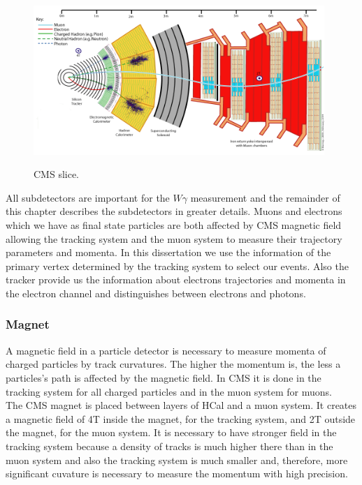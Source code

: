 \begin{figure}[htb]
  \begin{center}
    {\includegraphics[width=0.98\textwidth]{../figs/Exp/CMS_Slice.png}}
    \caption{CMS slice.}
    \label{fig:CMS_slice}
  \end{center}
\end{figure}


All subdetectors are important for the $W\gamma$ measurement and the remainder of this chapter describes the subdetectors in greater details. Muons and electrons which we have as final state particles are both affected by CMS magnetic field allowing the tracking system and the muon system to measure their trajectory parameters and momenta. In this dissertation we use the information of the primary vertex determined by the tracking system to select our events. Also the tracker provide us the information about electrons trajectories and momenta in the electron channel and distinguishes between electrons and photons.\\

\subsubsection{Magnet}

A magnetic field in a particle detector is necessary to measure momenta of charged particles by track curvatures. The higher the momentum is, the less a particles's path is affected by the magnetic field. In CMS it is done in the tracking system for all charged particles and in the muon system for muons.\\

The CMS magnet is placed between layers of HCal and a muon system. It creates a magnetic field of 4T inside the magnet, for the tracking system, and 2T outside the magnet, for the muon system. It is necessary to have stronger field in the tracking system because a density of tracks is much higher there than in the muon system and also the tracking system is much smaller and, therefore, more significant cuvature is necessary to measure the momentum with high precision.\\

